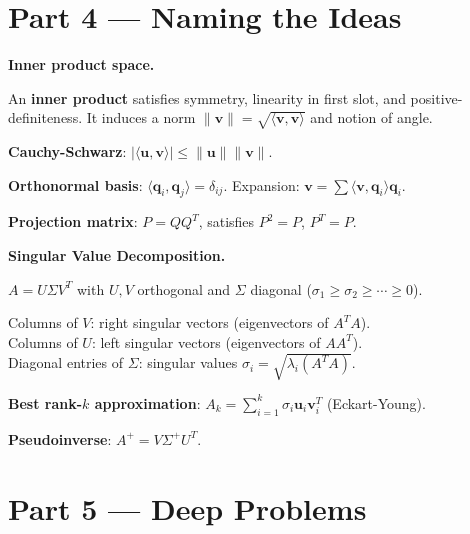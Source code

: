 \documentclass[12pt,a4paper]{article}
\begin{document}
\section{Part 4 \texorpdfstring{---}{--} Naming the Ideas}

\begin{namebox}
\textbf{Inner product space.}

An \textbf{inner product} satisfies symmetry, linearity in first slot, and positive-definiteness. It induces a norm $\|\mathbf{v}\|=\sqrt{\langle\mathbf{v},\mathbf{v}\rangle}$ and notion of angle.

\textbf{Cauchy-Schwarz}: $|\langle\mathbf{u},\mathbf{v}\rangle|\leq\|\mathbf{u}\|\|\mathbf{v}\|$.

\textbf{Orthonormal basis}: $\langle\mathbf{q}_i,\mathbf{q}_j\rangle=\delta_{ij}$. Expansion: $\mathbf{v}=\sum\langle\mathbf{v},\mathbf{q}_i\rangle\mathbf{q}_i$.

\textbf{Projection matrix}: $P=QQ^T$, satisfies $P^2=P$, $P^T=P$.
\end{namebox}

\begin{namebox}
\textbf{Singular Value Decomposition.}

$A = U\Sigma V^T$ with $U,V$ orthogonal and $\Sigma$ diagonal ($\sigma_1\geq\sigma_2\geq\cdots\geq 0$).

Columns of $V$: right singular vectors (eigenvectors of $A^TA$).\\
Columns of $U$: left singular vectors (eigenvectors of $AA^T$).\\
Diagonal entries of $\Sigma$: singular values $\sigma_i=\sqrt{\lambda_i(A^TA)}$.

\textbf{Best rank-$k$ approximation}: $A_k=\sum_{i=1}^k\sigma_i\mathbf{u}_i\mathbf{v}_i^T$ (Eckart-Young).

\textbf{Pseudoinverse}: $A^+=V\Sigma^+U^T$.
\end{namebox}

\section{Part 5 \texorpdfstring{---}{--} Deep Problems}
\end{document}
